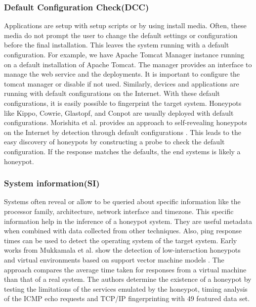 \subsubsection{Default Configuration Check(DCC)}
Applications are setup with setup scripts or by using install media. Often, these media do not prompt the user to change the default settings or configuration before the final installation. This leaves the system running with a default configuration. For example, we have Apache Tomcat Manager instance running on a default installation of Apache Tomcat. The manager provides an interface to manage the web service and the deployments. It is important to configure the tomcat manager or disable if not used. Similarly, devices and applications are running with default configurations on the Internet. With these default configurations, it is easily possible to fingerprint the target system. Honeypots like Kippo, Cowrie, Glastopf, and Conpot are usually deployed with default configurations. Morishita et al.  provides an approach to self-revealing honeypots on the Internet by detection through default configurations \cite{morishita}.  This leads to the easy discovery of honeypots by constructing a probe to check the default configuration. If the response matches the defaults, the end systems is likely a honeypot.

\subsubsection{System information(SI)}
Systems often reveal or allow to be queried about specific information like the processor family, architecture, network interface and timezone. This specific information help in the inference of a honeypot system. They are useful metadata when combined with data collected from other techniques.  Also, ping response times can be used to detect the operating system of the target system. Early works from Mukkamala et al.  show the detection of low-interaction honeypots and virtual environments based on support vector machine models \cite{mukkamala}. The approach compares the average time taken for responses from a virtual machine than that of a real system. The authors determine the existence of a honeypot by testing the limitations of the services emulated by the honeypot, timing analysis of the ICMP echo requests and TCP/IP fingerprinting with 49 featured data set.  
\newline
